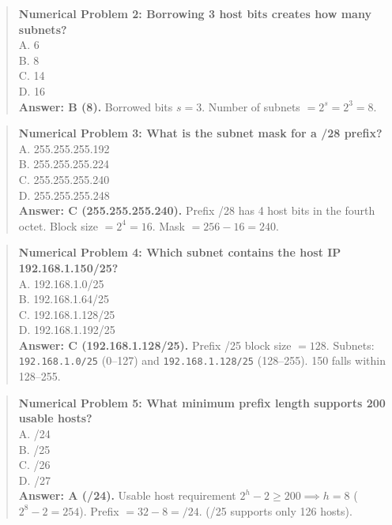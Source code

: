 \begin{quote}
\textbf{Numerical Problem 2: Borrowing 3 host bits creates how many subnets?}\\[4pt]
\quad A. 6\\[2pt]
\quad B. 8\\[2pt]
\quad C. 14\\[2pt]
\quad D. 16\\[2pt]
\vspace{4pt}
\textbf{Answer: B (8).} Borrowed bits $s = 3$. Number of subnets $= 2^s = 2^3 = 8$.
\end{quote}

\begin{quote}
\textbf{Numerical Problem 3: What is the subnet mask for a /28 prefix?}\\[4pt]
\quad A. 255.255.255.192\\[2pt]
\quad B. 255.255.255.224\\[2pt]
\quad C. 255.255.255.240\\[2pt]
\quad D. 255.255.255.248\\[2pt]
\vspace{4pt}
\textbf{Answer: C (255.255.255.240).} Prefix /28 has 4 host bits in the fourth octet. Block size $= 2^4 = 16$. Mask $= 256 - 16 = 240$.
\end{quote}

\begin{quote}
\textbf{Numerical Problem 4: Which subnet contains the host IP 192.168.1.150/25?}\\[4pt]
\quad A. 192.168.1.0/25\\[2pt]
\quad B. 192.168.1.64/25\\[2pt]
\quad C. 192.168.1.128/25\\[2pt]
\quad D. 192.168.1.192/25\\[2pt]
\vspace{4pt}
\textbf{Answer: C (192.168.1.128/25).} Prefix /25 block size $= 128$. Subnets: \texttt{192.168.1.0/25} (0--127) and \texttt{192.168.1.128/25} (128--255). 150 falls within 128--255.
\end{quote}

\begin{quote}
\textbf{Numerical Problem 5: What minimum prefix length supports 200 usable hosts?}\\[4pt]
\quad A. /24\\[2pt]
\quad B. /25\\[2pt]
\quad C. /26\\[2pt]
\quad D. /27\\[2pt]
\vspace{4pt}
\textbf{Answer: A (/24).} Usable host requirement $2^h - 2 \ge 200 \implies h = 8$ ($2^8 - 2 = 254$). Prefix $= 32 - 8 = /24$. (/25 supports only 126 hosts).
\end{quote}

